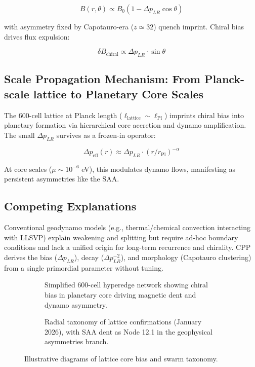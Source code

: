 \documentclass[11pt]{article}
\begin{document}
\[
B(r,\theta) \propto B_0 \left(1 - \Delta p_{LR} \cos\theta \right)
\]

with asymmetry fixed by Capotauro-era ($z \simeq 32$) quench imprint. Chiral bias drives flux expulsion:

\[
\delta B_{\text{chiral}} \propto \Delta p_{LR} \cdot \sin\theta
\]

\subsection{Scale Propagation Mechanism: From Planck-scale lattice to Planetary Core Scales}
The 600-cell lattice at Planck length ($\ell_{\text{lattice}} \sim \ell_{\text{Pl}}$) imprints chiral bias into planetary formation via hierarchical core accretion and dynamo amplification. The small $\Delta p_{LR}$ survives as a frozen-in operator:

\[
\Delta p_{\text{eff}}(r) \approx \Delta p_{LR} \cdot (r / r_{\text{Pl}})^{-\alpha}
\]

At core scales ($\mu \sim 10^{-6}$ eV), this modulates dynamo flows, manifesting as persistent asymmetries like the SAA.

\subsection{Competing Explanations}
Conventional geodynamo models (e.g., thermal/chemical convection interacting with LLSVP) explain weakening and splitting but require ad-hoc boundary conditions and lack a unified origin for long-term recurrence and chirality. CPP derives the bias ($\Delta p_{LR}$), decay ($\Delta p_{LR}^{-2}$), and morphology (Capotauro clustering) from a single primordial parameter without tuning.

\begin{figure}[htbp]
\centering
\begin{subfigure}{0.45\textwidth}
\centering
\caption{Simplified 600-cell hyperedge network showing chiral bias in planetary core driving magnetic dent and dynamo asymmetry.}
\label{fig:core-bias}
\end{subfigure}
\hfill
\begin{subfigure}{0.45\textwidth}
\centering
\caption{Radial taxonomy of lattice confirmations (January 2026), with SAA dent as Node 12.1 in the geophysical asymmetries branch.}
\label{fig:taxonomy}
\end{subfigure}
\caption{Illustrative diagrams of lattice core bias and swarm taxonomy.}
\end{figure}
\end{document}
